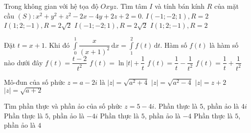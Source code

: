 \begin{ex}%
	Trong không gian với hệ tọa độ $Oxyz$. Tìm tâm $I$ và tính bán kính $R$ của mặt cầu $(S)\colon x^2+y^2+z^2-2x-4y+2z+2=0$. 
	\choice
	{$I\left(-1;-2;1\right),R=2$}
	{$I\left(1;2;-1\right),R=2\sqrt{2}$}
	{$I\left(-1;-2;1\right),R=2\sqrt{2}$}
	{\True $I\left(1;2;-1\right),R=2$}
\end{ex}
\begin{ex}%
	Đặt $t=x+1$. Khi đó $\displaystyle\int\limits_0^1 \dfrac{x}{\left(x+1\right)^2}\mathrm{\,d}x=\displaystyle\int\limits_1^2 f(t)\mathrm{\,d}t$. Hàm số $f(t)$ là hàm số nào dưới đây
	\choice
	{$f(t)=\dfrac{t-2}{t^2}$}
	{$f(t)=\ln \left|t \right|+\dfrac{1}{t}$}
	{\True $f(t)=\dfrac{1}{t}-\dfrac{1}{t^2}$}
	{$f(t)=\dfrac{1}{t}+\dfrac{1}{t^2}$}
\end{ex}
\begin{ex}%
	Mô-đun của số phức $z=a-2i$ là
	\choice
	{\True $\left|z\right|=\sqrt{a^2+4}$}
	{$\left|z\right|=\sqrt{a^2-4}$}
	{$\left|z\right|=z+2$}
	{$\left|z\right|=\sqrt{a+2}$}
\end{ex}
\begin{ex}%
	Tìm phần thực và phần ảo của số phức $z=5-4i$.
	\choice
	{Phần thực là $5$, phần ảo là $4i$}
	{Phần thực là $5$, phần ảo là $-4i$}
	{\True Phần thực là $5$, phần ảo là $-4$}
	{Phần thực là $5$, phần ảo là $4$}
\end{ex}

